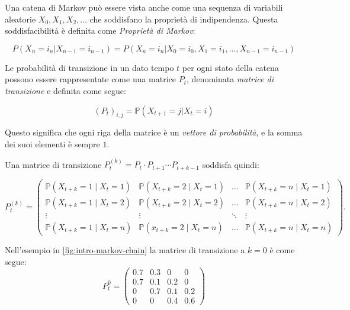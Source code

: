 Una catena di Markov può essere vista anche come una sequenza di variabili aleatorie $X_0, X_1, X_2, \dots$ che soddisfano la proprietà di indipendenza. Questa soddisfacibilità è definita come \textit{Proprietà di Markov}:

\begin{equation}
    P(X_n = i_n | X_{n - 1} = i_{n - 1}) = P(X_n = i_n | X_0 = i_0, X_1 = i_1, \dots, X_{n - 1} = i_{n - 1})
    \label{eq:intro-markov-property}
\end{equation}

Le probabilità di transizione in un dato tempo $t$ per ogni stato della catena possono essere rappresentate come una matrice $P_t$, denominata \textit{matrice di transizione} e definita come segue:

\begin{equation}
    (P_t)_{i,j} = \mathbb{P} (X_{t + 1} = j | X_t = i)
    \label{intro-extra-markov-matrix}
\end{equation}

Questo significa che ogni riga della matrice è un \textit{vettore di probabilità}, e la somma dei suoi elementi è sempre $1$. 

Una matrice di transizione $P_t^(k) = P_t \cdot P_{t + 1} \cdots P_{t + k - 1}$ soddisfa quindi: 

\begin{equation}
    P_t^{(k)} = \begin{pmatrix}
        \mathbb{P}(X_{t+k} = 1 \mid X_t = 1) & \mathbb{P}(X_{t+k} = 2 \mid X_t = 1) & \dots & \mathbb{P}(X_{t+k} = n \mid X_t = 1) \\
        \mathbb{P}(X_{t+k} = 1 \mid X_t = 2) & \mathbb{P}(X_{t+k} = 2 \mid X_t = 2) & \dots & \mathbb{P}(X_{t+k} = n \mid X_t = 2) \\
        \vdots & \vdots & \ddots & \vdots \\
        \mathbb{P}(X_{t+k} = 1 \mid X_t = n) & \mathbb{P}(x_{t+k} = 2 \mid X_t = n) & \dots & \mathbb{P}(X_{t+k} = n \mid X_t = n)
        \end{pmatrix}.
    \label{eq:intro-extra-markov-property}
\end{equation}

Nell'esempio in \autoref{fig:intro-markov-chain} la matrice di transizione a $k = 0$ è come segue:
\begin{equation}
    P_t^0 = \begin{pmatrix}
        0.7 & 0.3   & 0     & 0 \\
        0.7 & 0.1   & 0.2   & 0 \\
        0   & 0.7   & 0.1   & 0.2 \\
        0   & 0     & 0.4   & 0.6
    \end{pmatrix}
    \label{eq:intro-markov-tranmat}
\end{equation}

